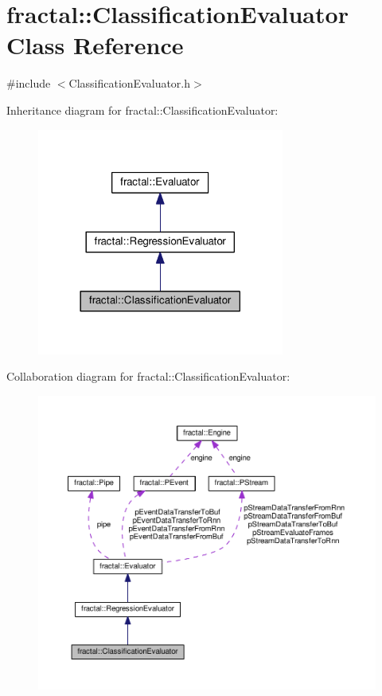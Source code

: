 \hypertarget{classfractal_1_1ClassificationEvaluator}{\section{fractal\+:\+:Classification\+Evaluator Class Reference}
\label{classfractal_1_1ClassificationEvaluator}
}


{\ttfamily \#include $<$Classification\+Evaluator.\+h$>$}



Inheritance diagram for fractal\+:\+:Classification\+Evaluator\+:\nopagebreak
\begin{figure}[H]
\begin{center}
\leavevmode
\includegraphics[width=230pt]{d6/ddb/classfractal_1_1ClassificationEvaluator__inherit__graph}
\end{center}
\end{figure}


Collaboration diagram for fractal\+:\+:Classification\+Evaluator\+:\nopagebreak
\begin{figure}[H]
\begin{center}
\leavevmode
\includegraphics[width=350pt]{df/d5d/classfractal_1_1ClassificationEvaluator__coll__graph}
\end{center}
\end{figure}
